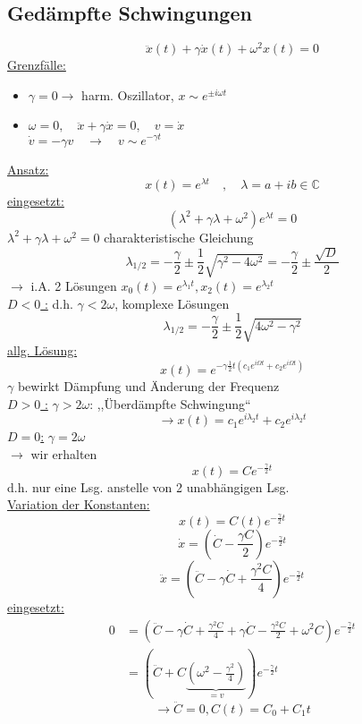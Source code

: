 \documentclass[titlepage,12pt,a4paper,ngerman]{report}
\begin{document}
{\subsection{Gedämpfte Schwingungen}
$$\ddot{x}(t) + \gamma \dot{x}(t) + \omega^2 x(t) = 0 $$
\underline{Grenzfälle:}
\begin{itemize}
	\item $ \gamma = 0 \rightarrow$ harm. Oszillator, $x \sim e^{\pm i \omega t}$
	\item $\omega = 0, \quad \ddot{x} + \gamma\dot{x} = 0, \quad v= \dot{x}$\\
	$\dot{v} = -\gamma v \quad \rightarrow \quad v \sim e^{-\gamma t}$
\end{itemize}
\underline{Ansatz:} $$x(t) = e^{\lambda t} \quad , \quad \lambda = a+ ib \in \mathbb{C}$$
\underline{eingesetzt:} $$(\lambda^2 + \gamma\lambda + \omega^2) e^{\lambda t} = 0$$
$\lambda^2 + \gamma \lambda + \omega^2 = 0 $ charakteristische Gleichung
$$\lambda_{1/2} = - \frac{\gamma}{2} \pm \frac{1}{2} \sqrt{\gamma^2 - 4\omega^2} = -\frac{\gamma}{2} \pm \frac{\sqrt{D}}{2}$$
$\rightarrow$ i.A. 2 Lösungen $x_0 (t) = e^{\lambda_1 t}, x_2(t) = e^{\lambda_2 t}$\\
\underline{$D<0$ :}
d.h. $\gamma < 2 \omega$, komplexe Lösungen
$$\lambda_{1/2} = - \frac{\gamma}{2} \pm \frac{1}{2} \sqrt{ 4\omega^2 - \gamma^2}$$
\underline{allg. Lösung:}
$$x(t) = e^{-\gamma \frac{1}{2} t (c_1 e^{i\Omega t} + c_2 e ^{i \Omega t})}$$
$\gamma$ bewirkt Dämpfung und Änderung der Frequenz\\
\underline{$D>0$ :}
$\gamma > 2\omega$: ,,Überdämpfte Schwingung``
$$\rightarrow x(t) = c_1 e^{i\lambda_2 t} + c_2 e ^{i \lambda_2 t}$$
\underline{$D = 0$:}
$\gamma = 2 \omega$\\
$\rightarrow$ wir erhalten 
$$x(t) = C e^{-\frac{\gamma}{2}t}$$
d.h. nur eine Lsg. anstelle von 2 unabhängigen Lsg.\\
\underline{Variation der Konstanten:}
$$x(t) = C(t) e^{- \frac{\gamma}{2}t}$$
$$\dot{x} = (\dot{C} - \frac{\gamma C}{2}) e ^{-\frac{\gamma}{2}t}$$
$$ \ddot{x} = (\ddot{C} - \gamma\dot{C} + \frac{\gamma^2 C }{4}) e ^{-\frac{\gamma}{2}t}$$
\underline{eingesetzt:}
\begin{align*}
0 & = (\ddot{C} - \gamma \dot{C} + \frac{\gamma^2 C}{4} + \gamma \dot{C} - \frac{\gamma^2 C}{2} + \omega^2 C ) e ^{-\frac{\gamma}{2}t}\\
& = ( \ddot{C} + C\underbrace{(\omega^2 - \frac{\gamma^2}{4})}_{=v} ) e ^{-\frac{\gamma}{2}t}
\end{align*}
$$\rightarrow \ddot{C} = 0 , C(t) = C_0 + C_1 t$$
}
\end{document}
